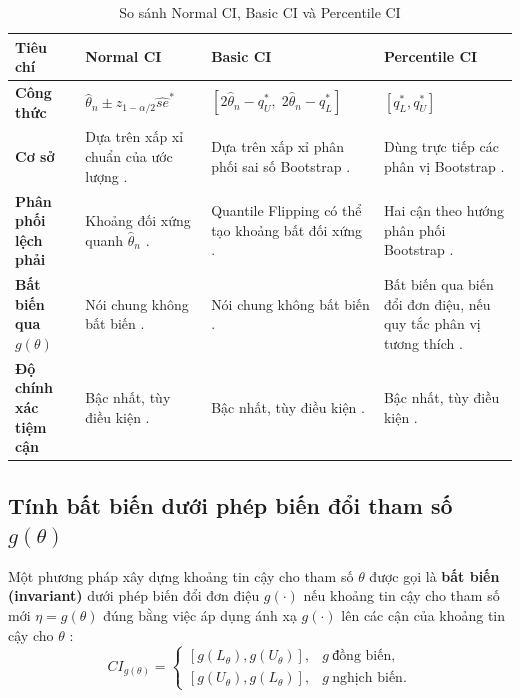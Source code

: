 \begin{table}[htbp]
	\centering
	\renewcommand{\arraystretch}{1.4}
	\setlength{\tabcolsep}{5pt}
	\caption{So sánh Normal CI, Basic CI và Percentile CI}
	\label{tab:trio_comparison}
	\small
	\setlength{\tabcolsep}{4pt}
	\begin{tabularx}{\textwidth}{>{\raggedright\arraybackslash}p{2.5cm}XXX}
		\toprule
		\textbf{Tiêu chí} & \textbf{Normal CI} & \textbf{Basic CI} & \textbf{Percentile CI} \\
		\midrule
		\textbf{Công thức} & $\hat{\theta}_n \pm z_{1-\alpha/2}\widehat{se}^*$ \cite{buithuytrang2026} & $[2\hat{\theta}_n-q_U^*,\;2\hat{\theta}_n-q_L^*]$ \cite{buithuytrang2026} & $[q_L^*,q_U^*]$ \cite{buithuytrang2026} \\
		\textbf{Cơ sở} & Dựa trên xấp xỉ chuẩn của ước lượng \cite{efron1993}. & Dựa trên xấp xỉ phân phối sai số Bootstrap \cite{davison1997}. & Dùng trực tiếp các phân vị Bootstrap \cite{efron1993}. \\
		\textbf{Phân phối lệch phải} & Khoảng đối xứng quanh $\hat{\theta}_n$ \cite{efron1993}. & Quantile Flipping có thể tạo khoảng bất đối xứng \cite{davison1997}. & Hai cận theo hướng phân phối Bootstrap \cite{efron1993}. \\
		\textbf{Bất biến qua $g(\theta)$} & Nói chung không bất biến \cite{efron1993}. & Nói chung không bất biến \cite{davison1997}. & Bất biến qua biến đổi đơn điệu, nếu quy tắc phân vị tương thích \cite{efron1993}. \\
		\textbf{Độ chính xác tiệm cận} & Bậc nhất, tùy điều kiện \cite{efron1993}. & Bậc nhất, tùy điều kiện \cite{davison1997}. & Bậc nhất, tùy điều kiện \cite{efron1993}. \\
		\bottomrule
	\end{tabularx}
\end{table}

\subsection{Tính bất biến dưới phép biến đổi tham số $g(\theta)$}

\begin{definition}
	Một phương pháp xây dựng khoảng tin cậy cho tham số $\theta$ được gọi là \textbf{bất biến (invariant)} dưới phép biến đổi đơn điệu $g(\cdot)$ nếu khoảng tin cậy cho tham số mới $\eta = g(\theta)$ đúng bằng việc áp dụng ánh xạ $g(\cdot)$ lên các cận của khoảng tin cậy cho $\theta$ \cite{efron1993}:
	\begin{equation}
		CI_{g(\theta)} =
    \begin{cases}
      [g(L_{\theta}),g(U_{\theta})], & g\ \text{đồng biến},\\
      [g(U_{\theta}),g(L_{\theta})], & g\ \text{nghịch biến}.
    \end{cases}
	\end{equation}
	\end{definition}
		
